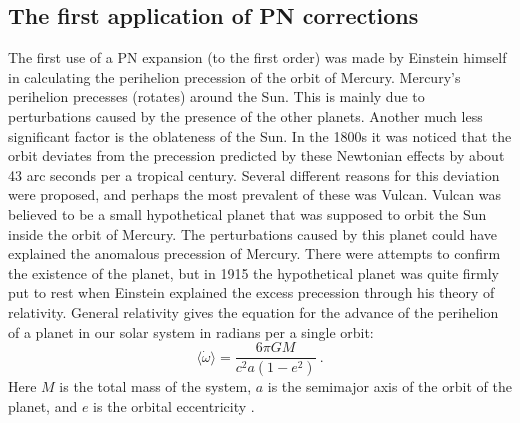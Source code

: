 \documentclass[english, oneside]{HYgradu}
\begin{document}
\subsection{The first application of PN corrections}

The first use of a PN expansion (to the first order) was made by Einstein himself in calculating the perihelion precession of the orbit of Mercury.
Mercury's perihelion precesses (rotates) around the Sun. This is mainly due to perturbations caused by the presence of the other planets. Another much less significant factor is the oblateness of the Sun. In the 1800s it was noticed that the orbit deviates from the precession predicted by these Newtonian effects by about 43 arc seconds per a tropical century.
Several different reasons for this deviation were proposed, and perhaps the most prevalent of these was Vulcan. Vulcan was believed to be a small hypothetical planet that was supposed to orbit the Sun inside the orbit of Mercury. The perturbations caused by this planet could have explained the anomalous precession of Mercury. 
There were attempts to confirm the existence of the planet, but in 1915 the hypothetical planet was quite firmly put to rest when Einstein explained the excess precession through his theory of relativity. General relativity gives the equation for the advance of the perihelion of a planet in our solar system in radians per a single orbit:
\begin{equation}
\langle \dot{\omega} \rangle = \frac{6 \pi G M}{c^2 a (1-e^2)} \ . \label{equ:pericenterShift}
\end{equation}
Here $M$ is the total mass of the system, $a$ is the semimajor axis of the orbit of the planet, and $e$ is the orbital eccentricity \citep{will:tegp}.
\end{document}
